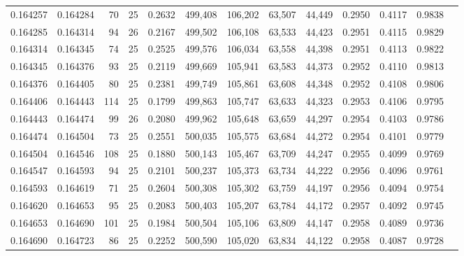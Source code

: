 \begin{tabular}{rrrrrrrrrrrrr}
0.164257 & 0.164284 &    70 &  25 &                                     0.2632 & 499,408 & 106,202 &  63,507 &  44,449 & 0.2950 & 0.4117 & 0.9838 \\
0.164285 & 0.164314 &    94 &  26 &                                     0.2167 & 499,502 & 106,108 &  63,533 &  44,423 & 0.2951 & 0.4115 & 0.9829 \\
0.164314 & 0.164345 &    74 &  25 &                                     0.2525 & 499,576 & 106,034 &  63,558 &  44,398 & 0.2951 & 0.4113 & 0.9822 \\
0.164345 & 0.164376 &    93 &  25 &                                     0.2119 & 499,669 & 105,941 &  63,583 &  44,373 & 0.2952 & 0.4110 & 0.9813 \\
0.164376 & 0.164405 &    80 &  25 &                                     0.2381 & 499,749 & 105,861 &  63,608 &  44,348 & 0.2952 & 0.4108 & 0.9806 \\
0.164406 & 0.164443 &   114 &  25 &                                     0.1799 & 499,863 & 105,747 &  63,633 &  44,323 & 0.2953 & 0.4106 & 0.9795 \\
0.164443 & 0.164474 &    99 &  26 &                                     0.2080 & 499,962 & 105,648 &  63,659 &  44,297 & 0.2954 & 0.4103 & 0.9786 \\
0.164474 & 0.164504 &    73 &  25 &                                     0.2551 & 500,035 & 105,575 &  63,684 &  44,272 & 0.2954 & 0.4101 & 0.9779 \\
0.164504 & 0.164546 &   108 &  25 &                                     0.1880 & 500,143 & 105,467 &  63,709 &  44,247 & 0.2955 & 0.4099 & 0.9769 \\
0.164547 & 0.164593 &    94 &  25 &                                     0.2101 & 500,237 & 105,373 &  63,734 &  44,222 & 0.2956 & 0.4096 & 0.9761 \\
0.164593 & 0.164619 &    71 &  25 &                                     0.2604 & 500,308 & 105,302 &  63,759 &  44,197 & 0.2956 & 0.4094 & 0.9754 \\
0.164620 & 0.164653 &    95 &  25 &                                     0.2083 & 500,403 & 105,207 &  63,784 &  44,172 & 0.2957 & 0.4092 & 0.9745 \\
0.164653 & 0.164690 &   101 &  25 &                                     0.1984 & 500,504 & 105,106 &  63,809 &  44,147 & 0.2958 & 0.4089 & 0.9736 \\
0.164690 & 0.164723 &    86 &  25 &                                     0.2252 & 500,590 & 105,020 &  63,834 &  44,122 & 0.2958 & 0.4087 & 0.9728 \\

\end{tabular}
